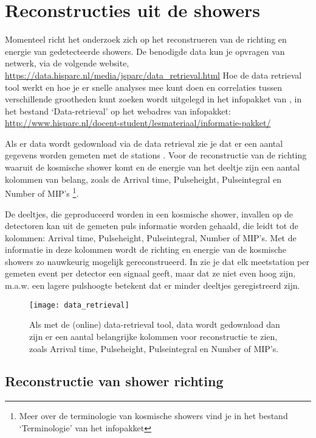 \section{Reconstructies uit de showers}

Momenteel richt het \hisparc onderzoek zich op het reconstrueren
van de richting  en energie van gedetecteerde showers. De benodigde data kun je opvragen
van \hisparc netwerk, via de volgende website,
\url{https://data.hisparc.nl/media/jsparc/data_retrieval.html} Hoe de
data retrieval tool werkt en hoe je er snelle analyses mee kunt doen en
correlaties tussen verschillende grootheden kunt zoeken wordt uitgelegd
in het infopakket van \hisparc, in het bestand `Data-retrieval' op het
webadres van infopakket:
\url{http://www.hisparc.nl/docent-student/lesmateriaal/informatie-pakket/}

Als er data wordt gedownload via de data retrieval zie je dat er een aantal
gegevens worden gemeten met de stations . Voor de
reconstructie van de richting waaruit de kosmische shower komt en de energie
van het deeltje zijn een aantal kolommen van belang, zoals de Arrival time,
Pulseheight, Pulseintegral en Number of MIP's \footnote{Meer over de terminologie
van kosmische showers vind je in het bestand `Terminologie' van het infopakket}.

De deeltjes, die geproduceerd worden in een kosmische shower, invallen op de
detectoren kan uit de gemeten puls informatie worden gehaald, die leidt tot de
kolommen: Arrival time, Pulseheight, Pulseintegral, Number of MIP's.
Met de informatie in deze kolommen wordt de richting en energie van de kosmische
showers zo nauwkeurig mogelijk gereconstrueerd. In  zie je
dat elk meetstation per gemeten event per detector een signaal geeft, maar
dat ze niet even hoog zijn, m.a.w. een lagere pulshoogte betekent dat er
minder deeltjes geregistreerd
zijn.

\begin{figure}
    \centering
    \texttt{[image: data\_retrieval]}
    \caption{Als met de (online) data-retrieval tool, data wordt gedownload dan zijn
    er een aantal belangrijke kolommen voor reconstructie te zien, zoals Arrival time,
    Pulseheight, Pulseintegral en Number of MIP's.}
    \label{fig:data_retrieval}
\end{figure}

\subsection{Reconstructie van shower richting}


